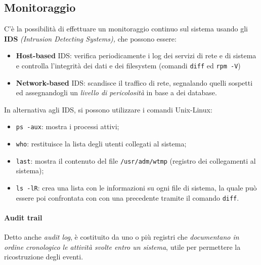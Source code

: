 \documentclass[a4paper,11pt]{article}
\def\code#1{\texttt{#1}}
\begin{document}
\subsection{Monitoraggio} C'è la possibilità di effettuare un monitoraggio continuo sul sistema usando gli \textbf{IDS} \textit{(Intrusion Detecting Systems),} che possono essere:
\begin{itemize}
\item \textbf{Host-based} IDS: verifica periodicamente i log dei servizi di rete e di sistema e controlla l'integrità dei dati e dei filesystem (comandi \code{diff} ed \code{rpm -V})
\item\textbf{ Network-based }IDS: scandisce il traffico di rete, segnalando quelli sospetti ed assegnandogli un
\textit{livello di pericolosità} in base a dei database. 
\end{itemize}
In alternativa agli IDS, si possono utilizzare i comandi Unix-Linux:
\begin{itemize}
\item \code{ps -aux}: mostra i processi attivi;
\item \code{who}: restituisce la lista degli utenti collegati al sistema;
\item \code{last}: mostra il contenuto del file \code{/usr/adm/wtmp} (registro dei collegamenti al sistema);
\item \code{ls -lR}: crea una lista con le informazioni su ogni file di sistema, la quale può essere poi confrontata con con una precedente tramite il comando \code{diff}.
\end{itemize}
\paragraph{Audit trail} 
Detto anche \textit{audit log}, è costituito da uno o più registri che \textit{documentano in ordine cronologico le attività svolte entro un sistema}, utile per permettere la ricostruzione degli eventi.
\end{document}
